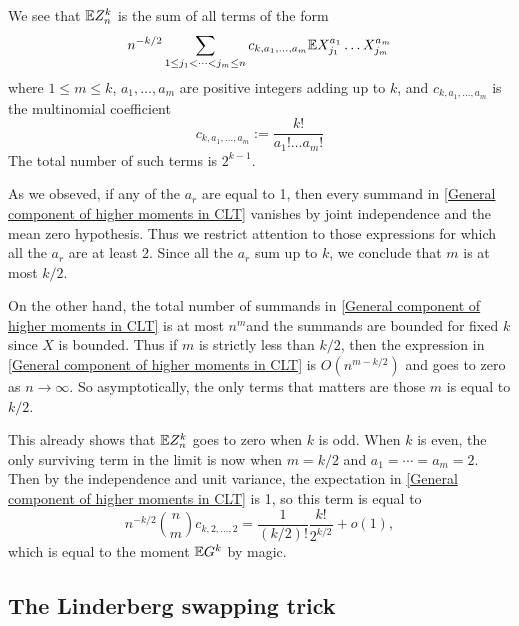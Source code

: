 We see that $\mathbb{E} Z_n^k$ is the sum of all terms of the form
\begin{equation}\label{General component of higher moments in CLT}
    n^{-k/2}\sum_{1\leq j_1<\cdots<j_m\leq n} c_{k,a_1,\dots,a_m}\mathbb{E} X_{j_1}^{a_1}\dots X_{j_m}^{a_m}
\end{equation}
where $1\leq m \leq k$, $a_1,\dots,a_m$ are positive integers adding up to $k$, and $c_{k,a_1,\dots,a_m}$ is the multinomial coefficient
\begin{equation*}
    c_{k,a_1,\dots,a_m}:=\frac{k!}{a_1!\dots a_m!}
\end{equation*}
The total number of such terms is $2^{k-1}$.

As we obseved, if any of the $a_r$ are equal to 1, then every summand in \ref{General component of higher moments in CLT} vanishes by joint independence and the mean zero hypothesis. Thus we restrict attention to those expressions for which all the $a_r$ are at least 2. Since all the $a_r$ sum up to $k$, we conclude that $m$ is at most $k/2$.

On the other hand, the total number of summands in \ref{General component of higher moments in CLT} is at most $n^m$and the summands are bounded for fixed $k$ since $X$ is bounded. Thus if $m$ is strictly less than $k/2$, then the expression in \ref{General component of higher moments in CLT} is $O(n^{m-k/2})$ and goes to zero as $n\to \infty$. So asymptotically, the only terms that matters are those $m$ is equal to $k/2$. 

This already shows that $\mathbb{E} Z_n^k$ goes to zero when $k$ is odd. When $k$ is even, the only surviving term in the limit is now when $m=k/2$ and $a_1=\cdots=a_m=2$. Then by the independence and unit variance, the expectation in \ref{General component of higher moments in CLT} is 1, so this term is equal to 
\begin{equation*}
    n^{-k/2}\binom{n}{m}c_{k,2,\dots,2} = \frac{1}{(k/2)!}\frac{k!}{2^{k/2}}+o(1),
\end{equation*}
which is equal to the moment $\mathbb{E} G^k$ by magic.

\subsection{The Linderberg swapping trick}


